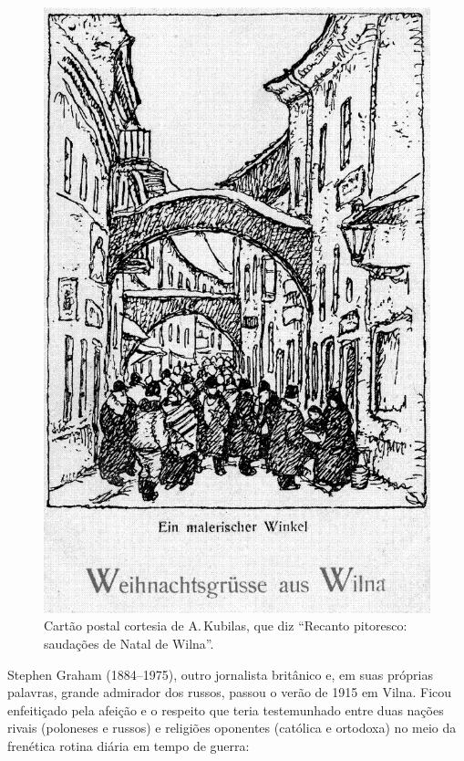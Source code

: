 
\begin{figure}[!hp]
    \centering
    \includegraphics[width=\textwidth]{ilustra-08.png}
    \caption{Cartão postal cortesia de A.\,Kubilas, que diz ``Recanto pitoresco: saudações de Natal de Wilna''.}
\end{figure}

Stephen Graham (1884--1975), outro jornalista britânico e, em suas
próprias palavras, grande admirador dos russos, passou o verão de 1915
em Vilna. Ficou enfeitiçado pela afeição e o respeito que teria
testemunhado entre duas nações rivais (poloneses e russos) e religiões
oponentes (católica e ortodoxa) no meio da frenética rotina diária em
tempo de guerra:

